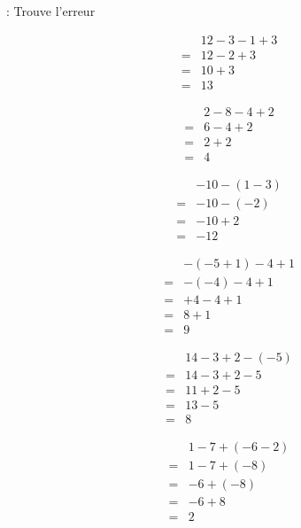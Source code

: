  : Trouve l'erreur 


\begin{multicols}{3}
    \begin{align*}
        &12-3-1+ 3\\
        =&12-2+3\\
        =&10+3\\
        =&13
    \end{align*}

    \begin{align*}
        &2-8-4+2\\
        =&6-4+2\\
        =&2+2\\
        =&4
    \end{align*}  

    \begin{align*}
        &-10-(1-3)\\
        =&-10-(-2)\\
        =&-10+2\\
        =&-12
    \end{align*}
\end{multicols}

\begin{multicols}{3}
    \begin{align*}
        &-(-5+1)-4+1\\
        =&-(-4)- 4+1\\
        =&+4- 4+1\\
        =&8+1\\
        =&9
    \end{align*}

    \begin{align*}
        &14-3+2- (-5)\\
        =&14-3+2-5\\
        =&11+2-5\\
        =&13-5\\
        =&8
    \end{align*}

    \begin{align*}
        &1-7+(-6-2)\\
        =&1-7+(-8)\\
        =&-6+(-8)\\
        =&-6+8\\
        =&2
    \end{align*} 
\end{multicols}


